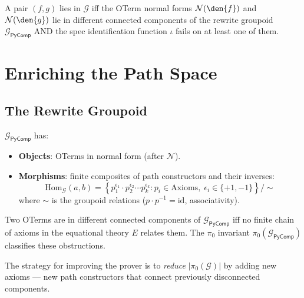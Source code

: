 \begin{proposition}
\label{prop:gap-char}
A pair $(f, g)$ lies in $\mathcal{G}$ iff the OTerm normal forms
$\mathcal{N}(\den{f})$ and $\mathcal{N}(\den{g})$ lie in
different connected components of the rewrite groupoid
$\mathcal{G}_{\mathsf{PyComp}}$ AND the spec identification
function $\iota$ fails on at least one of them.
\end{proposition}


\section{Enriching the Path Space}
\label{sec:enriching-paths}

\subsection{The Rewrite Groupoid}

\begin{definition}
\label{def:rewrite-groupoid}
$\mathcal{G}_{\mathsf{PyComp}}$ has:
\begin{itemize}
  \item \textbf{Objects}: OTerms in normal form (after $\mathcal{N}$).
  \item \textbf{Morphisms}: finite composites of path constructors
    and their inverses:
    \[
      \mathrm{Hom}_{\mathcal{G}}(a, b) =
      \left\{ p_1^{\epsilon_1} \cdot p_2^{\epsilon_2} \cdots
      p_k^{\epsilon_k} :
      p_i \in \mathrm{Axioms},\; \epsilon_i \in \{+1, -1\}
      \right\} / {\sim}
    \]
    where $\sim$ is the groupoid relations ($p \cdot p^{-1} =
    \mathrm{id}$, associativity).
\end{itemize}
\end{definition}

\begin{proposition}
\label{prop:fundamental-obstruction}
Two OTerms are in different connected components of
$\mathcal{G}_{\mathsf{PyComp}}$ iff no finite chain of axioms
in the equational theory $E$ relates them.  The $\pi_0$ invariant
$\pi_0(\mathcal{G}_{\mathsf{PyComp}})$ classifies these
obstructions.
\end{proposition}

The strategy for improving the prover is to \emph{reduce}
$|\pi_0(\mathcal{G})|$ by adding new axioms --- new path
constructors that connect previously disconnected components.

